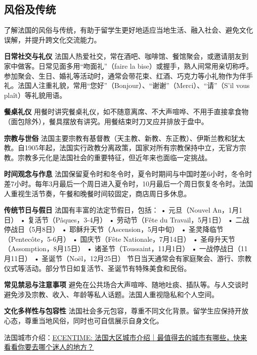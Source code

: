 \subsection{风俗及传统}

了解法国的风俗与传统，有助于留学生更好地适应当地生活、融入社会、避免文化误解，并提升跨文化交流能力。

\textbf{日常社交与礼仪}
法国人热爱社交，常在酒吧、咖啡馆、餐馆聚会，或邀请朋友到家中做客。日常见面多用“吻面礼”（faire la bise）或握手，熟人间常用亲切称呼。参加聚会、生日、婚礼等活动时，通常会带花束、红酒、巧克力等小礼物作为伴手礼。法国人注重礼貌，常用“您好”（Bonjour）、“谢谢”（Merci）、“请”（S'il vous plaît）等礼貌用语。

\textbf{餐桌礼仪}
用餐时讲究餐桌礼仪，如不随意离席、不大声喧哗、不用手直接拿食物（面包除外），餐具摆放有讲究。用餐结束时刀叉应并排放于盘中。

\textbf{宗教与世俗}
法国主要宗教有基督教（天主教、新教、东正教）、伊斯兰教和犹太教。自1905年起，法国实行政教分离政策，国家对所有宗教保持中立，无官方宗教。宗教多元化是法国社会的重要特征，但近年来也面临一定挑战。

\textbf{时间观念与作息}
法国保留夏令时和冬令时，夏令时期间与中国时差6小时，冬令时差7小时。每年3月最后一个周日进入夏令时，10月最后一个周日恢复冬令时。法国人重视生活节奏，午餐和晚餐时间较固定，商店周日多休息。

\textbf{传统节日与假日}
法国有丰富的法定节假日，包括：
• 元旦（Nouvel An，1月1日）
• 复活节（Pâques，3-4月）
• 劳动节（Fête du Travail，5月1日）
• 二战停战日（5月8日）
• 耶稣升天节（Ascension，5月中旬）
• 圣灵降临节（Pentecôte，5-6月）
• 国庆节（Fête Nationale，7月14日）
• 圣母升天节（Assomption，8月15日）
• 诸圣节（Toussaint，11月1日）
• 一战停战日（11月11日）
• 圣诞节（Noël，12月25日）
节日当天通常会有家庭聚会、游行、宗教仪式等活动。部分节日如复活节、圣诞节有特殊美食和民俗。

\textbf{常见禁忌与注意事项}
避免在公共场合大声喧哗、随地吐痰、插队等。与人交谈时避免涉及宗教、收入、年龄等私人话题。法国人重视隐私和个人空间。

\textbf{文化多样性与包容性}
法国社会多元包容，尊重不同文化背景。留学生应保持开放心态，尊重当地风俗，同时也可自信展示自身文化。

法国城市介绍：\href{https://www.ecentime.com/article/-france-geographie}{ECENTIME: 法国大区城市介绍｜最值得去的城市有哪些，快来看看你要去哪个迷人的地方？}

